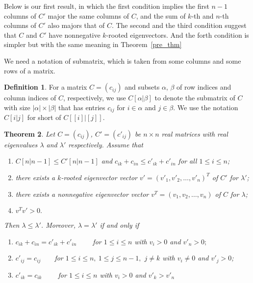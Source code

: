 \documentclass[12pt, a4paper]{article}
\theoremstyle{plain}
\newtheorem{thm}{Theorem}[section]
\theoremstyle{definition}
\newtheorem{defn}[thm]{Definition}
\begin{document}
Below is our first result, in which the first condition implies the first $n-1$ columns of $C'$ major
 the same columns of $C$, and the sum of $k$-th and $n$-th columns of $C'$ also majors that of $C$. The second and the third condition
 suggest that $C$ and $C'$ have nonnegative $k$-rooted eigenvectors. And the forth condition is simpler
  but with the same meaning in Theorem~\ref{pre_thm} 


We need a notation of submatrix, which is taken from some columns and some rows of a matrix.

\begin{defn}
    For a matrix $C=(c_{ij})$ and subsets $\alpha$, $\beta$ of row indices and column
    indices of $C$, respectively, we use $C[\alpha|\beta]$ to denote the
    submatrix of $C$ with size $ |\alpha| \times |\beta| $ that has entries $c_{ij}$ for $i\in \alpha$
    and $j\in\beta$. We use the notation $C[i|j]$ for short of $C[[i]|[j]].$
\end{defn}





\begin{thm}\label{thm_main}
    Let $C=(c_{ij})$, $C'=(c'_{ij})$ be  $n\times n$ real matrices with real eigenvalues $\lambda$ and $\lambda'$ respectively.
Assume that
\begin{enumerate}[label=(\roman*)]
\item \label{thm_main:condition_i} $C[n|n-1]\leq C'[n|n-1]$ and $c_{ik}+c_{in}\leq c'_{ik}+c'_{in}$ for all $1\leq i\leq n$;
\item \label{thm_main:condition_ii} there exists a $k$-rooted eigenvector vector $v'=(v'_1, v'_2, \ldots, v'_n)^T$ of $C'$ for $\lambda'$;
\item \label{thm_main:condition_iii}there exists a nonnegative eigenvector vector $v^T=(v_1, v_2, \ldots, v_n)$ of $C$ for $\lambda$;
 \item \label{thm_main:condition_iv}$v^Tv'>0.$
\end{enumerate}
 Then $\lambda\leq \lambda'$.
Moreover, $\lambda=\lambda'$
if and only if
\begin{enumerate}[label=(\alph*)]
    \item \label{thm_main:equ_cond_a} $c_{ik}+c_{in}=c'_{ik}+c'_{in} \qquad$  for $1\leq i\leq n$ with $v_i>0$ and $v'_n>0;$
    \item \label{thm_main:equ_cond_b} $c'_{ij}=c_{ij}\qquad $for $1\leq i\leq n,~1\leq j\leq n-1,$ $j \neq k$ with $v_i\ne 0 $ and $v'_j>0$;
    \item \label{thm_main:equ_cond_c} $c'_{ik}=c_{ik} \qquad $  for $1\leq i \leq n$ with  $v_i>0$ and $ v'_{k}>v'_n$
\end{enumerate} 
\end{thm}
\end{document}
